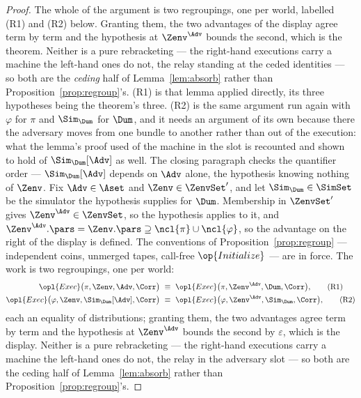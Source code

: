 \documentclass[10pt,oneside,openany]{book}
\theoremstyle{accentdef}
\theoremstyle{accentplain}
\begin{document}
\begin{proof}
The whole of the argument is two regroupings, one per world, labelled (R1) and (R2) below. Granting
them, the two advantages of the display agree term by term and the hypothesis at $\Zenv^{\Adv}$
bounds the second, which is the theorem. Neither is a pure rebracketing --- the right-hand
executions carry a machine the left-hand ones do not, the relay standing at the ceded identities ---
so both are the \emph{ceding} half of Lemma~\ref{lem:absorb} rather than
Proposition~\ref{prop:regroup}'s. (R1) is that lemma applied directly, its three hypotheses being
the theorem's three. (R2) is the same argument run again with $\varphi$ for $\pi$ and $\Sim_{\Dum}$
for $\Dum$, and it needs an argument of its own because there the adversary moves from one bundle to
another rather than out of the execution: what the lemma's proof used of the machine in the slot is
recounted and shown to hold of $\Sim_{\Dum}[\Adv]$ as well. The closing paragraph checks the
quantifier order --- $\Sim_{\Dum}[\Adv]$ depends on $\Adv$ alone, the hypothesis knowing nothing of
$\Zenv$.
Fix $\Adv \in \Aset$ and $\Zenv \in \ZenvSet'$, and let $\Sim_{\Dum} \in \SimSet$ be the simulator
the hypothesis supplies for $\Dum$. Membership in $\ZenvSet'$ gives $\Zenv^{\Adv} \in \ZenvSet$,
so the hypothesis applies to it, and
$\Zenv^{\Adv}.\pars = \Zenv.\pars \supseteq \ncl{\pi} \cup \ncl{\varphi}$, so the advantage on the
right of the display is defined. The conventions of Proposition~\ref{prop:regroup} --- independent
coins, unmerged tapes, call-free $\op{Initialize}$ --- are in force. The work is two regroupings,
one per world:
\begin{align*}
  \opl{Exec}\bigl(\pi,\Zenv,\Adv,\Corr\bigr) &\ \equiv\ \opl{Exec}\bigl(\pi,\Zenv^{\Adv},\Dum,\Corr\bigr) , \tag{R1}\\
  \opl{Exec}\bigl(\varphi,\Zenv,\Sim_{\Dum}[\Adv],\Corr\bigr) &\ \equiv\ \opl{Exec}\bigl(\varphi,\Zenv^{\Adv},\Sim_{\Dum},\Corr\bigr) , \tag{R2}
\end{align*}
each an equality of distributions; granting them, the two advantages agree term by term and the
hypothesis at $\Zenv^{\Adv}$ bounds the second by $\varepsilon$, which is the display. Neither is a
pure rebracketing --- the right-hand executions carry a machine the left-hand ones do not, the relay
in the adversary slot --- so both are the ceding half of Lemma~\ref{lem:absorb} rather than
Proposition~\ref{prop:regroup}'s.


\end{proof}
\end{document}
